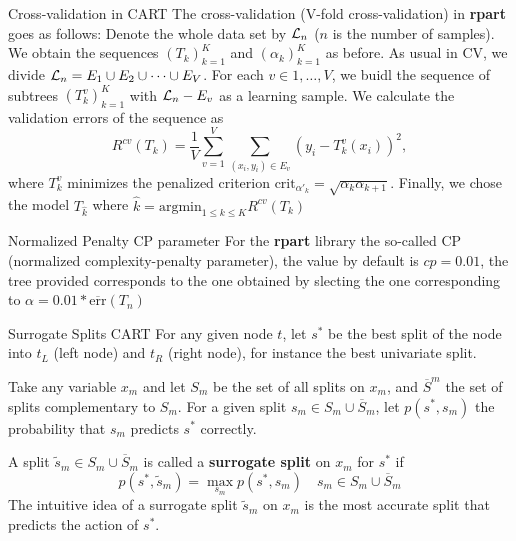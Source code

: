 \documentclass{beamer}
\begin{document}
\begin{frame}{Cross-validation in CART}
	The cross-validation (V-fold cross-validation) in \textbf{rpart} goes as follows:
	Denote the whole data set by ${\cal L}_n$ ($n$ is the number of samples). We obtain the sequences $(T_k)_{k=1}^K$ and $(\alpha_k)_{k =1}^K$ as before.  
	As usual in CV, we divide ${\cal L}_n= E_1 \cup E_2 \cup \cdots \cup E_V$. For each $v \in 1,\ldots, V$, we buidl the sequence of subtrees $(T_k^v)_{k=1}^K$ with ${\cal L}_n - E_v$ as a learning sample. We calculate the validation errors of the sequence as
	\begin{equation*}
		R^{cv}(T_k)= \frac{1}{V} \sum_{v=1}^V \sum_{(x_i,y_i)\in E_v} (y_i - T_k^v(x_i))^2,
	\end{equation*}
	where $T_k^v$ minimizes the penalized criterion $\text{crit}_{\alpha'_k}= \sqrt{\alpha_k \alpha_{k+1}}$. 
	Finally, we chose the model $T_{\hat{k}}$ where $\hat{k}= \text{argmin}_{1\le k \le K}R^{cv}(T_k)$
\end{frame}

\begin{frame}{Normalized Penalty CP parameter}
	For the \textbf{rpart} library the so-called CP (normalized complexity-penalty parameter), the value by default is $cp=0.01$, the tree provided corresponds to the one obtained by slecting the one corresponding to $\alpha=0.01* \overline{\text{err}}(T_n)$
\end{frame}

\begin{frame}{Surrogate Splits CART}
	For any given node $t$, let $s^*$ be the best split of the node into $t_L$ (left node) and $t_R$ (right node), for instance the best univariate split.
	
	Take any variable $x_m$ and let $S_m$ be the set of all splits on $x_m$, and $\overline{S}^m$ the set of splits complementary to $S_m$.  For a given split $s_m\in S_m \cup \overline{S}_m$, let  $p(s^*,s_m)$ the probability that $s_m$ predicts $s^*$ correctly.
	
	A split $\tilde{s}_m   \in S_m \cup \overline{S}_m$ is called a \textbf{surrogate split} on $x_m$ for $s^*$ if 
	\begin{equation*}
		p(s^*,\tilde{s}_m)= \max_{s_m} p(s^*,s_m) \quad s_m \in S_m \cup \overline{S}_m
	\end{equation*}
	The intuitive idea of a surrogate split $\tilde{s}_m$ on $x_m$ is the most accurate split that predicts the action of $s^*$. 
\end{frame}
\end{document}
